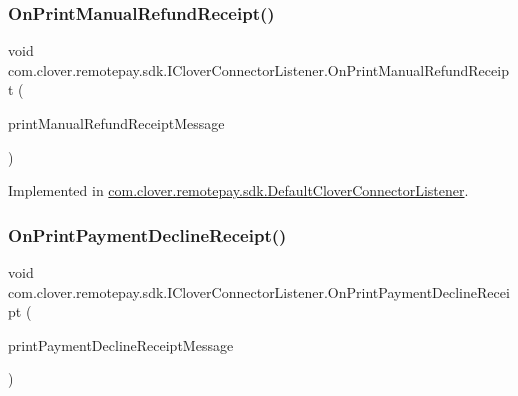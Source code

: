\subsubsection{\texorpdfstring{On\+Print\+Manual\+Refund\+Receipt()}{OnPrintManualRefundReceipt()}}
{\footnotesize\ttfamily void com.\+clover.\+remotepay.\+sdk.\+I\+Clover\+Connector\+Listener.\+On\+Print\+Manual\+Refund\+Receipt (\begin{DoxyParamCaption}\item[{\hyperlink{classcom_1_1clover_1_1remotepay_1_1sdk_1_1_print_manual_refund_receipt_message}{Print\+Manual\+Refund\+Receipt\+Message}}]{print\+Manual\+Refund\+Receipt\+Message }\end{DoxyParamCaption})}



Implemented in \hyperlink{classcom_1_1clover_1_1remotepay_1_1sdk_1_1_default_clover_connector_listener_aed1c6c0e8dec09e3e724d752747d1b05}{com.\+clover.\+remotepay.\+sdk.\+Default\+Clover\+Connector\+Listener}.

\mbox{\label{interfacecom_1_1clover_1_1remotepay_1_1sdk_1_1_i_clover_connector_listener_a3f1e0e6bd2b019c4e1ecbbb39078d0a7}} 
\subsubsection{\texorpdfstring{On\+Print\+Payment\+Decline\+Receipt()}{OnPrintPaymentDeclineReceipt()}}
{\footnotesize\ttfamily void com.\+clover.\+remotepay.\+sdk.\+I\+Clover\+Connector\+Listener.\+On\+Print\+Payment\+Decline\+Receipt (\begin{DoxyParamCaption}\item[{\hyperlink{classcom_1_1clover_1_1remotepay_1_1sdk_1_1_print_payment_decline_receipt_message}{Print\+Payment\+Decline\+Receipt\+Message}}]{print\+Payment\+Decline\+Receipt\+Message }\end{DoxyParamCaption})}



